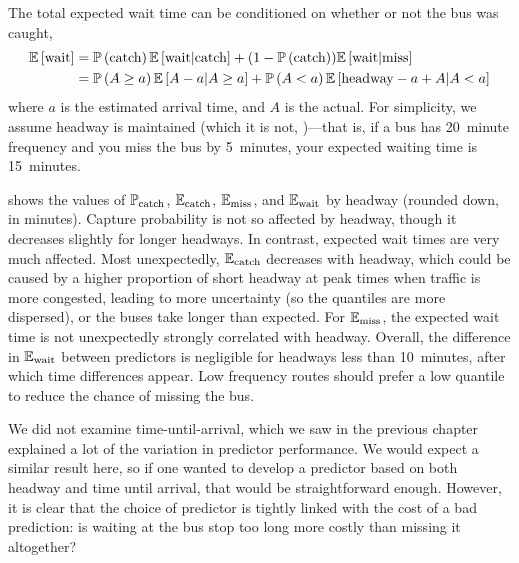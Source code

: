 The total expected wait time can be conditioned on whether or not the bus was caught,
\begin{equation}
\label{eq:eta_wait_conditional}
\begin{split}
\mathbb{E}\left[\text{wait}\right] &=
  \mathbb{P}\left(\text{catch}\right) \mathbb{E}\left[\text{wait}|\text{catch}\right] +
  (1 - \mathbb{P}\left(\text{catch}\right)) \mathbb{E}\left[\text{wait}|\text{miss}\right] \\
  &= \mathbb{P}\left(A \geq a\right) \mathbb{E}\left[A - a | A \geq a\right] +
  \mathbb{P}\left(A < a\right)\mathbb{E}\left[\text{headway} - a + A | A < a\right]
\end{split}
\end{equation}
where $a$ is the estimated arrival time, and $A$ is the actual. For simplicity, we assume headway is maintained (which it is not, \cite{})---that is, if a bus has 20~minute frequency and you miss the bus by 5~minutes, your expected waiting time is 15~minutes.

 shows the values of $\mathbb{P}_\text{catch}$, $\mathbb{E}_\text{catch}$, $\mathbb{E}_\text{miss}$, and $\mathbb{E}_\text{wait}$ by headway (rounded down, in minutes). Capture probability is not so affected by headway, though it decreases slightly for longer headways. In contrast, expected wait times are very much affected. Most unexpectedly, $\mathbb{E}_\text{catch}$ decreases with headway, which could be caused by a higher proportion of short headway at peak times when traffic is more congested, leading to more uncertainty (so the quantiles are more dispersed), or the buses take longer than expected. For $\mathbb{E}_\text{miss}$, the expected wait time is not unexpectedly strongly correlated with headway. Overall, the difference in $\mathbb{E}_\text{wait}$ between predictors is negligible for headways less than 10~minutes, after which time differences appear. Low frequency routes should prefer a low quantile to reduce the chance of missing the bus.


We did not examine time-until-arrival, which we saw in the previous chapter explained a lot of the variation in predictor performance. We would expect a similar result here, so if one wanted to develop a predictor based on both headway and time until arrival, that would be straightforward enough. However, it is clear that the choice of predictor is tightly linked with the cost of a bad prediction: is waiting at the bus stop too long more costly than missing it altogether?
